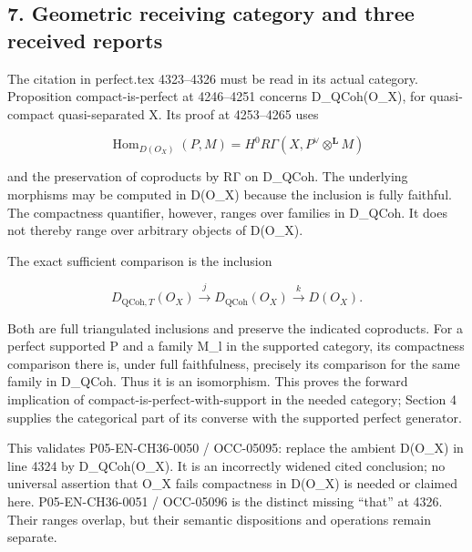 \subsection{7. Geometric receiving category and three received reports}\label{proofs-11121-11450-geometric-receiving-category-and-three-received-reports}

The citation in perfect.tex 4323–\allowbreak{}4326 must be read in its actual category. Proposition compact-is-perfect at 4246–\allowbreak{}4251 concerns D\_\allowbreak{}QCoh(O\_\allowbreak{}X)\allowbreak{},\allowbreak{} for quasi-compact quasi-separated X. Its proof at 4253–\allowbreak{}4265 uses

\[
 \operatorname{Hom}_{D(O_X)}(P,M)
    =H^0R\Gamma(X,P^\vee\otimes^{\mathbf L}M)
\]

and the preservation of coproducts by RΓ on D\_\allowbreak{}QCoh. The underlying morphisms may be computed in D(O\_\allowbreak{}X)\allowbreak{} because the inclusion is fully faithful. The compactness quantifier,\allowbreak{} however,\allowbreak{} ranges over families in D\_\allowbreak{}QCoh. It does not thereby range over arbitrary objects of D(O\_\allowbreak{}X)\allowbreak{}.

The exact sufficient comparison is the inclusion

\[
 D_{\mathrm{QCoh},T}(O_X)
    \xrightarrow{\ j\ }D_{\mathrm{QCoh}}(O_X)
    \xrightarrow{\ k\ }D(O_X).
\]

Both are full triangulated inclusions and preserve the indicated coproducts. For a perfect supported P and a family M\_\allowbreak{}l in the supported category,\allowbreak{} its compactness comparison there is,\allowbreak{} under full faithfulness,\allowbreak{} precisely its comparison for the same family in D\_\allowbreak{}QCoh. Thus it is an isomorphism. This proves the forward implication of compact-is-perfect-with-support in the needed category; Section 4 supplies the categorical part of its converse with the supported perfect generator.

This validates P05-EN-CH36-0050 /\allowbreak{} OCC-05095:\allowbreak{} replace the ambient D(O\_\allowbreak{}X)\allowbreak{} in line 4324 by D\_\allowbreak{}QCoh(O\_\allowbreak{}X)\allowbreak{}. It is an incorrectly widened cited conclusion; no universal assertion that O\_\allowbreak{}X fails compactness in D(O\_\allowbreak{}X)\allowbreak{} is needed or claimed here. P05-EN-CH36-0051 /\allowbreak{} OCC-05096 is the distinct missing ``that'' at 4326. Their ranges overlap,\allowbreak{} but their semantic dispositions and operations remain separate.

